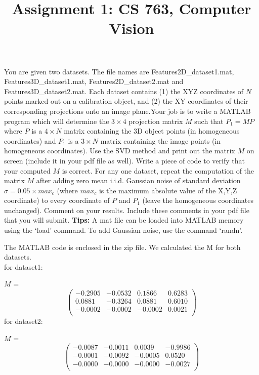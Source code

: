 \documentclass[a4paper,10pt]{article}
\title{Assignment 1: CS 763, Computer Vision}
\author{}
\begin{document}
\maketitle

You are given two datasets. The file names are Features2D\_dataset1.mat, Features3D\_dataset1.mat,
Features2D\_dataset2.mat and \\ Features3D\_dataset2.mat. Each dataset contains (1) the XYZ coordinates 
of $N$ points marked out on a calibration object, and (2) the XY coordinates of their corresponding projections
onto an image plane.Your job is to write a MATLAB program which will determine the $3 \times 4$ projection
matrix $M$ such that $P_1 = MP$ where $P$ is a $4 \times N$ matrix containing the 3D object points
(in homogeneous coordinates) and $P_1$ is a $3 \times N$ matrix containing the image points (in homogeneous 
coordinates). Use the SVD method and print out the matrix $M$ on screen (include it in your pdf file as well). 
Write a piece of code to verify that your computed $M$ is correct. For any one dataset, repeat the computation
of the matrix $M$ after adding zero mean i.i.d. Gaussian noise of standard deviation $\sigma = 0.05 \times max_c$ (where $max_c$ is the maximum 
absolute value of the X,Y,Z coordinate) to every coordinate of $P$ and $P_1$ (leave the homogeneous coordinates unchanged). Comment on your results. Include these 
comments in your pdf file that you will submit. \textbf{Tips:} A mat file can be loaded into MATLAB memory using the `load' command. To add Gaussian noise, 
use the command `randn'.

The MATLAB code is enclosed in the zip file.
We calculated the M for both datasets.
\\for dataset1:

$M$ = \[ \left( \begin{array}{cccc}
		-0.2905 & -0.0532 & 0.1866 & 0.6283\\
		0.0881 & -0.3264 & 0.0881 & 0.6010\\
		-0.0002 & -0.0002 & -0.0002 & 0.0021\\
              \end{array} \right)\] 
for dataset2:

$M$ = \[ \left( \begin{array}{cccc}
		-0.0087 & -0.0011  & 0.0039 & -0.9986\\
		-0.0001 & -0.0092 & -0.0005 &  0.0520\\
		-0.0000 & -0.0000 & -0.0000 & -0.0027\\
              \end{array} \right)\]
\end{document}
